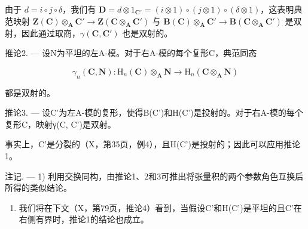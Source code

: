 由于 \(d = i \circ j \circ \delta\)，我们有 \(\mathbf{D} = d \otimes 1_{\mathbf{C}'} = (i \otimes 1) \circ (j \otimes 1) \circ (\delta \otimes 1)\)，这表明典范映射 \(\mathbf{Z}(\mathbf{C}) \otimes_{\mathbf{A}} \mathbf{C}' \to \mathbf{Z}(\mathbf{C} \otimes_{\mathbf{A}} \mathbf{C}')\) 与 \(\mathbf{B}(\mathbf{C}) \otimes_{\mathbf{A}} \mathbf{C}' \to \mathbf{B}(\mathbf{C} \otimes_{\mathbf{A}} \mathbf{C}')\) 是双射，因此通过取商，\(\gamma(\mathbf{C}, \mathbf{C}')\) 也是双射的。

推论2. --- 设N为平坦的左A-模。对于右A-模的每个复形C，典范同态

\[
\gamma_ {n} (\mathbf {C}, \mathbf {N}): \mathrm{H} _ {n} (\mathbf {C}) \otimes_ {\mathbf {A}} \mathbf {N} \rightarrow \mathrm{H} _ {n} (\mathbf {C} \otimes_ {\mathbf {A}} \mathbf {N})
\]

都是双射的。

推论3. --- 设C'为左A-模的复形，使得B(C')和H(C')是投射的。对于右A-模的每个复形C，映射γ(C, C')是双射。

事实上，C'是分裂的（X，第35页，例4），且H(C')是投射的；因此可以应用推论1。

注记. --- 1) 利用交换同构，由推论1、2和3可推出将张量积的两个参数角色互换后所得的类似结论。

\begin{enumerate}
\def\labelenumi{\arabic{enumi})}
\setcounter{enumi}{1}
\tightlist
\item
  我们将在下文（X，第79页，推论4）看到，当假设C'和H(C')是平坦的且C'在右侧有界时，推论1的结论也成立。
\end{enumerate}

